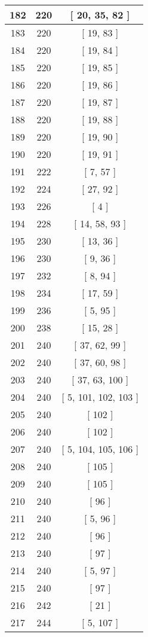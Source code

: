 \begin{center}
\begin{longtable}[H]{|| c c c ||}
\hline
182 & 220 & [ 20, 35, 82 ] \\ 
\hline
183 & 220 & [ 19, 83 ] \\ 
\hline
184 & 220 & [ 19, 84 ] \\ 
\hline
185 & 220 & [ 19, 85 ] \\ 
\hline
186 & 220 & [ 19, 86 ] \\ 
\hline
187 & 220 & [ 19, 87 ] \\ 
\hline
188 & 220 & [ 19, 88 ] \\ 
\hline
189 & 220 & [ 19, 90 ] \\ 
\hline
190 & 220 & [ 19, 91 ] \\ 
\hline
191 & 222 & [ 7, 57 ] \\ 
\hline
192 & 224 & [ 27, 92 ] \\ 
\hline
193 & 226 & [ 4 ] \\ 
\hline
194 & 228 & [ 14, 58, 93 ] \\ 
\hline
195 & 230 & [ 13, 36 ] \\ 
\hline
196 & 230 & [ 9, 36 ] \\ 
\hline
197 & 232 & [ 8, 94 ] \\ 
\hline
198 & 234 & [ 17, 59 ] \\ 
\hline
199 & 236 & [ 5, 95 ] \\ 
\hline
200 & 238 & [ 15, 28 ] \\ 
\hline
201 & 240 & [ 37, 62, 99 ] \\ 
\hline
202 & 240 & [ 37, 60, 98 ] \\ 
\hline
203 & 240 & [ 37, 63, 100 ] \\ 
\hline
204 & 240 & [ 5, 101, 102, 103 ] \\ 
\hline
205 & 240 & [ 102 ] \\ 
\hline
206 & 240 & [ 102 ] \\ 
\hline
207 & 240 & [ 5, 104, 105, 106 ] \\ 
\hline
208 & 240 & [ 105 ] \\ 
\hline
209 & 240 & [ 105 ] \\ 
\hline
210 & 240 & [ 96 ] \\ 
\hline
211 & 240 & [ 5, 96 ] \\ 
\hline
212 & 240 & [ 96 ] \\ 
\hline
213 & 240 & [ 97 ] \\ 
\hline
214 & 240 & [ 5, 97 ] \\ 
\hline
215 & 240 & [ 97 ] \\ 
\hline
216 & 242 & [ 21 ] \\ 
\hline
217 & 244 & [ 5, 107 ] \\ 

\end{longtable}
\end{center}
